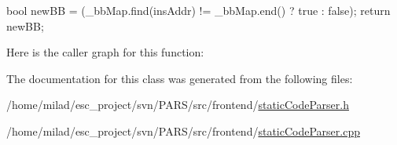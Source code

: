 \begin{DoxyCode}
                                              {
        bool newBB = (_bbMap.find(insAddr) != _bbMap.end() ? true : false);
        return newBB;
}
\end{DoxyCode}


Here is the caller graph for this function:




The documentation for this class was generated from the following files:\begin{DoxyCompactItemize}
\item 
/home/milad/esc\_\-project/svn/PARS/src/frontend/\hyperlink{staticCodeParser_8h}{staticCodeParser.h}\item 
/home/milad/esc\_\-project/svn/PARS/src/frontend/\hyperlink{staticCodeParser_8cpp}{staticCodeParser.cpp}\end{DoxyCompactItemize}
